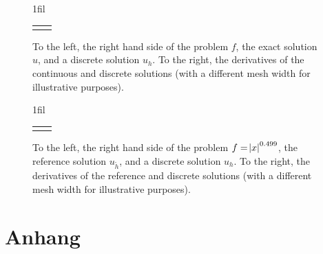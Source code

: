 \documentclass[headsepline,footsepline,footinclude=false,oneside,fontsize=11pt,paper=a4,listof=totoc,bibliography=totoc]{scrbook} %
\makeatletter
\newcommand*{\centerfloat}{%
	\parindent \z@
	\leftskip \z@ \@plus 1fil \@minus \textwidth
	\rightskip\leftskip
	\parfillskip \z@skip}
\makeatother
\begin{document}
\begin{figure}[h!]
	\centerfloat
	\begin{tabular}{c@{\hskip -1em}c}
	 & 	
	\end{tabular}
	\caption[Solution to $f = \sin$]{To the left, the right hand side of the problem $f$, the exact solution $u$, and a discrete solution $u_h$. To the right, the derivatives of the continuous and discrete solutions (with a different mesh width for illustrative purposes).}
\end{figure}

\begin{figure}[h!]
	\centerfloat
	\begin{tabular}{c@{\hskip -1em}c}
		 & 	
	\end{tabular}
	\caption[Solution to $f = \abs{x}^{\frac{1}{2} - \epsilon}$]{To the left, the right hand side of the problem $f = \abs{x}^{0.499}$, the reference solution $u_{\tilde{h}}$, and a discrete solution $u_h$. To the right, the derivatives of the reference and discrete solutions (with a different mesh width for illustrative purposes).}
\end{figure}

\chapter{Anhang}

\printbibliography{}
\end{document}
